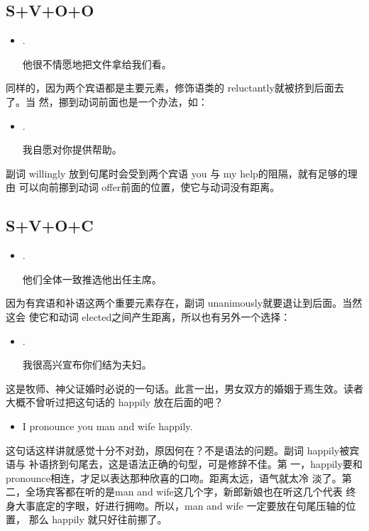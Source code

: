 \subsection{S+V+O+O}

\begin{itemize}
\item  {}    .

  他很不情愿地把文件拿给我们看。
\end{itemize}

同样的，因为两个宾语都是主要元素，修饰语类的 reluctantly就被挤到后面去了。当
然，挪到动词前面也是一个办法，如：
\begin{itemize}
\item  {}    .

  我自愿对你提供帮助。
\end{itemize}
副词 willingly 放到句尾时会受到两个宾语 you 与 my help的阻隔，就有足够的理由
可以向前挪到动词 offer前面的位置，使它与动词没有距离。

\subsection{S+V+O+C}

\begin{itemize}
\item  {}    .

  他们全体一致推选他出任主席。
\end{itemize}
因为有宾语和补语这两个重要元素存在，副词 unanimously就要退让到后面。当然这会
使它和动词 elected之间产生距离，所以也有另外一个选择：
\begin{itemize}
\item  {}    .

  我很高兴宣布你们结为夫妇。
\end{itemize}
这是牧师、神父证婚时必说的一句话。此言一出，男女双方的婚姻于焉生效。读者大概不曾听过把这句话的
happily 放在后面的吧？
\begin{itemize}
\item  I pronounce you man and wife happily.
\end{itemize}
这句话这样讲就感觉十分不对劲，原因何在？不是语法的问题。副词 happily被宾语与
补语挤到句尾去，这是语法正确的句型，可是修辞不佳。第
一，happily要和 pronounce相连，才足以表达那种欣喜的口吻。距离太远，语气就太冷
淡了。第二，全场宾客都在听的是man and wife这几个字，新郎新娘也在听这几个代表
终身大事底定的字眼，好进行拥吻。所以，man and wife 一定要放在句尾压轴的位置，
那么 happily 就只好往前挪了。

